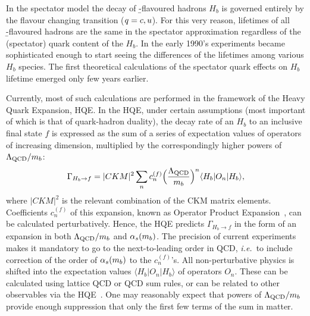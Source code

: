 %
%


In the spectator model the decay of \b-flavoured hadrons $H_b$ is
governed entirely by the flavour changing  transition
($q=c,u$).  For this very reason, lifetimes of all
\b-flavoured hadrons are the same in the spectator approximation
regardless of the (spectator) quark content of the $H_b$.  In the early
1990's experiments became sophisticated enough to start seeing the
differences of the lifetimes among various $H_b$ species.  The first
theoretical calculations of the spectator quark effects on $H_b$
lifetime emerged only few years earlier.

Currently, most of such calculations are performed in the framework of
the Heavy Quark Expansion, HQE.  In the HQE, under certain assumptions
(most important of which is that of quark-hadron duality), the decay
rate of an $H_b$ to an inclusive final state $f$ is expressed as the sum
of a series of expectation values of operators of increasing dimension,
multiplied by the correspondingly higher powers of $\Lambda_{\rm
QCD}/m_b$:
\begin{equation}
\Gamma_{H_b\to f} = |CKM|^2\sum_n c_n^{(f)}
\Bigl(\frac{\Lambda_{\rm QCD}}{m_b}\Bigr)^n\langle H_b|O_n|H_b\rangle,
\labe{hqe}
\end{equation}
where $|CKM|^2$ is the relevant combination of the CKM matrix elements.
Coefficients $c_n^{(f)}$ of this expansion, known as Operator Product
Expansion~\cite{Shifman:1986mx,*Chay:1990da,*Bigi:1992su,*Bigi:1992su_erratum},
can be calculated perturbatively.  Hence, the HQE
predicts $\Gamma_{H_b\to f}$ in the form of an expansion in both
$\Lambda_{\rm QCD}/m_{b}$ and $\alpha_s(m_{b})$.  The precision of
current experiments makes it mandatory to go to the next-to-leading
order in QCD, {\em i.e.}\ to include correction of the order of
$\alpha_s(m_{b})$ to the $c_n^{(f)}$'s.  All non-perturbative physics
is shifted into the expectation values $\langle H_b|O_n|H_b\rangle$ of
operators $O_n$.  These can be calculated using lattice QCD or QCD sum
rules, or can be related to other observables via the
HQE~\cite{Bigi:1995jr,*Bellini:1996ra}.  One may reasonably expect that powers of
$\Lambda_{\rm QCD}/m_{b}$ provide enough suppression that only the
first few terms of the sum in  matter.

